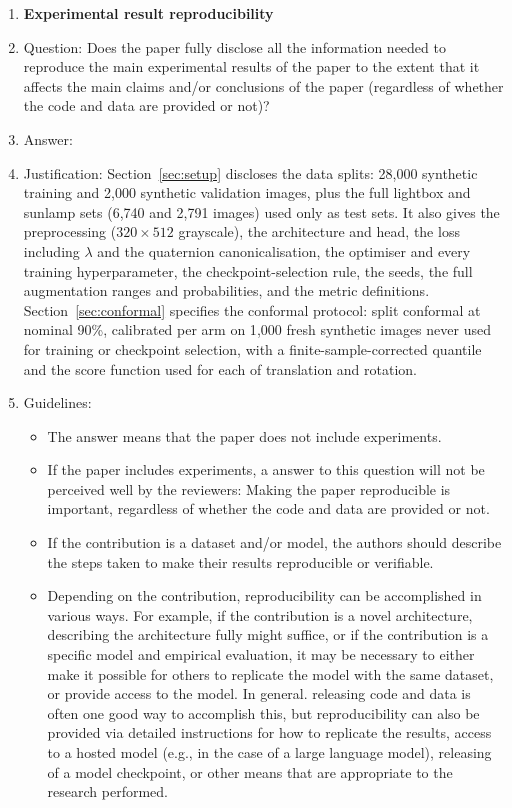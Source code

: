 \begin{enumerate}
    \item {\bf Experimental result reproducibility}
    \item[] Question: Does the paper fully disclose all the information needed to reproduce the main experimental results of the paper to the extent that it affects the main claims and/or conclusions of the paper (regardless of whether the code and data are provided or not)?
    \item[] Answer: \answerYes{}
    \item[] Justification: Section~\ref{sec:setup} discloses the data splits: 28{,}000 synthetic training
    and 2{,}000 synthetic validation images, plus the full lightbox and sunlamp sets
    (6{,}740 and 2{,}791 images) used only as test sets. It also gives the preprocessing
    ($320{\times}512$ grayscale), the architecture and head, the loss including $\lambda$ and
    the quaternion canonicalisation, the optimiser and every training hyperparameter, the
    checkpoint-selection rule, the seeds, the full augmentation ranges and probabilities, and
    the metric definitions. Section~\ref{sec:conformal} specifies the conformal protocol:
    split conformal at nominal 90\%, calibrated per arm on 1{,}000 fresh synthetic images
    never used for training or checkpoint selection, with a finite-sample-corrected quantile
    and the score function used for each of translation and rotation.
    \item[] Guidelines:
    \begin{itemize}
        \item The answer \answerNA{} means that the paper does not include experiments.
        \item If the paper includes experiments, a \answerNo{} answer to this question will not be perceived well by the reviewers: Making the paper reproducible is important, regardless of whether the code and data are provided or not.
        \item If the contribution is a dataset and\slash or model, the authors should describe the steps taken to make their results reproducible or verifiable. 
        \item Depending on the contribution, reproducibility can be accomplished in various ways. For example, if the contribution is a novel architecture, describing the architecture fully might suffice, or if the contribution is a specific model and empirical evaluation, it may be necessary to either make it possible for others to replicate the model with the same dataset, or provide access to the model. In general. releasing code and data is often one good way to accomplish this, but reproducibility can also be provided via detailed instructions for how to replicate the results, access to a hosted model (e.g., in the case of a large language model), releasing of a model checkpoint, or other means that are appropriate to the research performed.

\end{itemize}
\end{enumerate}
